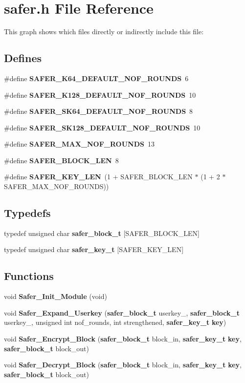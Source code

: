 \section{safer.h File Reference}
\label{safer_8h}




This graph shows which files directly or indirectly include this file:\subsection*{Defines}
\begin{CompactItemize}
\item 
\#define {\bf SAFER\_\-K64\_\-DEFAULT\_\-NOF\_\-ROUNDS}\ 6
\item 
\#define {\bf SAFER\_\-K128\_\-DEFAULT\_\-NOF\_\-ROUNDS}\ 10
\item 
\#define {\bf SAFER\_\-SK64\_\-DEFAULT\_\-NOF\_\-ROUNDS}\ 8
\item 
\#define {\bf SAFER\_\-SK128\_\-DEFAULT\_\-NOF\_\-ROUNDS}\ 10
\item 
\#define {\bf SAFER\_\-MAX\_\-NOF\_\-ROUNDS}\ 13
\item 
\#define {\bf SAFER\_\-BLOCK\_\-LEN}\ 8
\item 
\#define {\bf SAFER\_\-KEY\_\-LEN}\ (1 + SAFER\_\-BLOCK\_\-LEN $\ast$ (1 + 2 $\ast$ SAFER\_\-MAX\_\-NOF\_\-ROUNDS))
\end{CompactItemize}
\subsection*{Typedefs}
\begin{CompactItemize}
\item 
typedef unsigned char {\bf safer\_\-block\_\-t} [SAFER\_\-BLOCK\_\-LEN]
\item 
typedef unsigned char {\bf safer\_\-key\_\-t} [SAFER\_\-KEY\_\-LEN]
\end{CompactItemize}
\subsection*{Functions}
\begin{CompactItemize}
\item 
void {\bf Safer\_\-Init\_\-Module} (void)
\item 
void {\bf Safer\_\-Expand\_\-Userkey} ({\bf safer\_\-block\_\-t} userkey\_, {\bf safer\_\-block\_\-t} userkey\_, unsigned int nof\_\-rounds, int strengthened, {\bf safer\_\-key\_\-t} {\bf key})
\item 
void {\bf Safer\_\-Encrypt\_\-Block} ({\bf safer\_\-block\_\-t} block\_\-in, {\bf safer\_\-key\_\-t} {\bf key}, {\bf safer\_\-block\_\-t} block\_\-out)
\item 
void {\bf Safer\_\-Decrypt\_\-Block} ({\bf safer\_\-block\_\-t} block\_\-in, {\bf safer\_\-key\_\-t} {\bf key}, {\bf safer\_\-block\_\-t} block\_\-out)
\end{CompactItemize}


